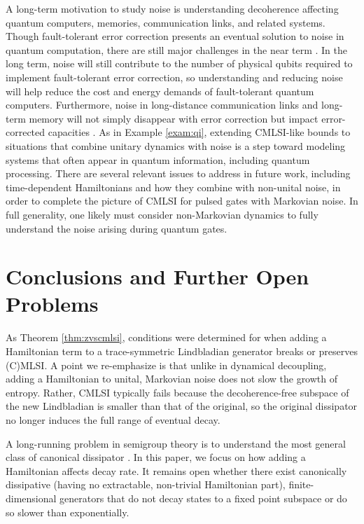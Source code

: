 \documentclass[accepted=2026-02-01, letterpaper]{quantumarticle}
\begin{document}
A long-term motivation to study noise is understanding decoherence affecting quantum computers, memories, communication links, and related systems. Though fault-tolerant error correction presents an eventual solution to noise in quantum computation, there are still major challenges in the near term \cite{preskill_quantum_2018, aharonov_polynomial-time_2023}. In the long term, noise will still contribute to the number of physical qubits required to implement fault-tolerant error correction, so understanding and reducing noise will help reduce the cost and energy demands of fault-tolerant quantum computers. Furthermore, noise in long-distance communication links and long-term memory will not simply disappear with error correction but impact error-corrected capacities \cite{wilde_quantum_2017}. As in Example \ref{exam:qi}, extending CMLSI-like bounds to situations that combine unitary dynamics with noise is a step toward modeling systems that often appear in quantum information, including quantum processing. There are several relevant issues to address in future work, including time-dependent Hamiltonians and how they combine with non-unital noise, in order to complete the picture of CMLSI for pulsed gates with Markovian noise. In full generality, one likely must consider non-Markovian dynamics to fully understand the noise arising during quantum gates.







\section{Conclusions and Further Open Problems} \label{sec:conclusions}
As Theorem \ref{thm:zvscmlsi}, conditions were determined for when adding a Hamiltonian term to a trace-symmetric Lindbladian generator breaks or preserves (C)MLSI. A point we re-emphasize is that unlike in dynamical decoupling, adding a Hamiltonian to unital, Markovian noise does not slow the growth of entropy. Rather, CMLSI typically fails because the decoherence-free subspace of the new Lindbladian is smaller than that of the original, so the original dissipator no longer induces the full range of eventual decay.

A long-running problem in semigroup theory is to understand the most general class of canonical dissipator \cite{hayden_canonical_2022}. In this paper, we focus on how adding a Hamiltonian affects decay rate. It remains open whether there exist canonically dissipative (having no extractable, non-trivial Hamiltonian part), finite-dimensional generators that do not decay states to a fixed point subspace or do so slower than exponentially.
\end{document}

